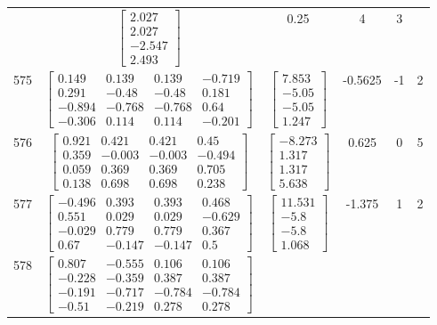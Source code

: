 \documentclass[a4paper,12pt]{article}
\begin{document}
\begin{tabular}{c c c c c c}
&
$\begin{bmatrix} 2.027 \\ 2.027 \\ -2.547 \\ 2.493 \end{bmatrix}$
&
0.25
&
4
&
3
\\
575
&
$\begin{bmatrix} 0.149 & 0.139 & 0.139 & -0.719 \\ 0.291 & -0.48 & -0.48 & 0.181 \\ -0.894 & -0.768 & -0.768 & 0.64 \\ -0.306 & 0.114 & 0.114 & -0.201 \end{bmatrix}$
&
$\begin{bmatrix} 7.853 \\ -5.05 \\ -5.05 \\ 1.247 \end{bmatrix}$
&
-0.5625
&
-1
&
2
\\
576
&
$\begin{bmatrix} 0.921 & 0.421 & 0.421 & 0.45 \\ 0.359 & -0.003 & -0.003 & -0.494 \\ 0.059 & 0.369 & 0.369 & 0.705 \\ 0.138 & 0.698 & 0.698 & 0.238 \end{bmatrix}$
&
$\begin{bmatrix} -8.273 \\ 1.317 \\ 1.317 \\ 5.638 \end{bmatrix}$
&
0.625
&
0
&
5
\\
577
&
$\begin{bmatrix} -0.496 & 0.393 & 0.393 & 0.468 \\ 0.551 & 0.029 & 0.029 & -0.629 \\ -0.029 & 0.779 & 0.779 & 0.367 \\ 0.67 & -0.147 & -0.147 & 0.5 \end{bmatrix}$
&
$\begin{bmatrix} 11.531 \\ -5.8 \\ -5.8 \\ 1.068 \end{bmatrix}$
&
-1.375
&
1
&
2
\\
578
&
$\begin{bmatrix} 0.807 & -0.555 & 0.106 & 0.106 \\ -0.228 & -0.359 & 0.387 & 0.387 \\ -0.191 & -0.717 & -0.784 & -0.784 \\ -0.51 & -0.219 & 0.278 & 0.278 \end{bmatrix}$

\end{tabular}
\end{document}
